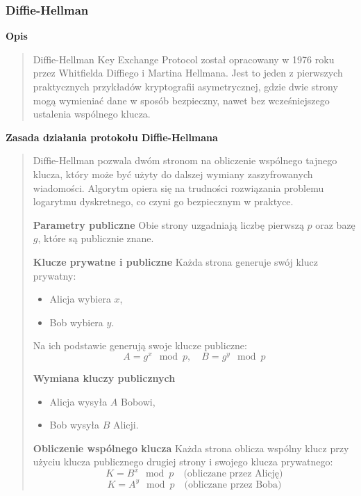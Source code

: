 \documentclass[12pt,a4paper]{article}
\begin{document}
\subsubsection{Diffie-Hellman}
\noindent\textbf{Opis}
\begin{quotation}\noindent Diffie-Hellman Key Exchange Protocol został opracowany w 1976 roku przez Whitfielda Diffiego i Martina Hellmana. Jest to jeden z pierwszych praktycznych przykładów kryptografii asymetrycznej, gdzie dwie strony mogą wymieniać dane w sposób bezpieczny, nawet bez wcześniejszego ustalenia wspólnego klucza.\newline
\end{quotation}

\noindent\textbf{Zasada działania protokołu Diffie-Hellmana}
\begin{quotation}\noindent Diffie-Hellman pozwala dwóm stronom na obliczenie wspólnego tajnego klucza, który może być użyty do dalszej wymiany zaszyfrowanych wiadomości. Algorytm opiera się na trudności rozwiązania problemu logarytmu dyskretnego, co czyni go bezpiecznym w praktyce.\newline

\noindent\textbf{Parametry publiczne}
Obie strony uzgadniają liczbę pierwszą \( p \) oraz bazę \( g \), które są publicznie znane.\newline

\noindent\textbf{Klucze prywatne i publiczne}
Każda strona generuje swój klucz prywatny:
\begin{itemize}
    \item Alicja wybiera \( x \),
    \item Bob wybiera \( y \).
\end{itemize}

Na ich podstawie generują swoje klucze publiczne:
\[
A = g^x \mod p, \quad B = g^y \mod p
\]

\noindent\textbf{Wymiana kluczy publicznych}
\begin{itemize}
    \item Alicja wysyła \( A \) Bobowi,
    \item Bob wysyła \( B \) Alicji.
\end{itemize}

\noindent\textbf{Obliczenie wspólnego klucza}
Każda strona oblicza wspólny klucz przy użyciu klucza publicznego drugiej strony i swojego klucza prywatnego:
\[
K = B^x \mod p \quad \text{(obliczane przez Alicję)}
\]
\[
K = A^y \mod p \quad \text{(obliczane przez Boba)}
\]


\end{quotation}
\end{document}
